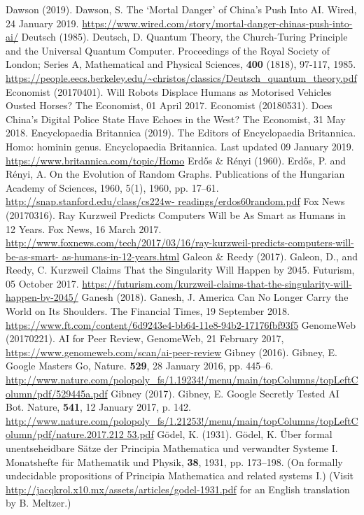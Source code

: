 \begin{multicols}{2}
\begin{thebibliography}{99}
 Dawson (2019). Dawson, S. The `Mortal Danger' of China's Push Into AI. Wired, 24 January 2019. \url{https://www.wired.com/story/mortal-danger-chinas-push-into-ai/}
 Deutsch (1985). Deutsch, D. Quantum Theory, the Church-Turing Principle and the Universal Quantum Computer. Proceedings of the Royal Society of London; Series A, Mathematical and Physical Sciences, \textbf{400} (1818), 97-117, 1985. \url{https://people.eecs.berkeley.edu/~christos/classics/Deutsch_quantum_theory.pdf}
 Economist (20170401). Will Robots Displace Humans as Motorised Vehicles Ousted Horses? The Economist, 01 April 2017.
 Economist (20180531). Does China's Digital Police State Have Echoes in the West? The Economist, 31 May 2018.
 Encyclopaedia Britannica (2019). The Editors of Encyclopaedia Britannica. Homo: hominin genus. Encyclopaedia Britannica. Last updated 09 January 2019. \url{https://www.britannica.com/topic/Homo}
 Erdős \& Rényi (1960). Erdős, P. and Rényi, A. On the Evolution of Random Graphs. Publications of the Hungarian Academy of Sciences, 1960, 5(1), 1960, pp. 17--61. \url{http://snap.stanford.edu/class/cs224w- readings/erdos60random.pdf}
 Fox News (20170316). Ray Kurzweil Predicts Computers Will be As Smart as Humans in 12 Years. Fox News, 16 March 2017. \url{http://www.foxnews.com/tech/2017/03/16/ray-kurzweil-predicts-computers-will-be-as-smart- as-humans-in-12-years.html}
 Galeon \& Reedy (2017). Galeon, D., and Reedy, C. Kurzweil Claims That the Singularity Will Happen by 2045. Futurism, 05 October 2017. \url{https://futurism.com/kurzweil-claims-that-the-singularity-will-happen-by-2045/}
 Ganesh (2018). Ganesh, J. America Can No Longer Carry the World on Its Shoulders. The Financial Times, 19 September 2018. \url{https://www.ft.com/content/6d9243e4-bb64-11e8-94b2-17176fbf93f5}
 GenomeWeb (20170221). AI for Peer Review, GenomeWeb, 21 February 2017, \url{https://www.genomeweb.com/scan/ai-peer-review}
 Gibney (2016). Gibney, E. Google Masters Go, Nature. \textbf{529}, 28 January 2016, pp. 445--6. \url{http://www.nature.com/polopoly_fs/1.19234!/menu/main/topColumns/topLeftColumn/pdf/529445a.pdf}
 Gibney (2017). Gibney, E. Google Secretly Tested AI Bot. Nature, \textbf{541}, 12 January 2017, p. 142. \url{http://www.nature.com/polopoly_fs/1.21253!/menu/main/topColumns/topLeftColumn/pdf/nature.2017.212 53.pdf}
 Gödel, K. (1931). Gödel, K. Über formal unentseheidbare Sätze der Principia Mathematica und verwandter Systeme I. Monatshefte für Mathematik und Physik, \textbf{38}, 1931, pp. 173--198. (On formally undecidable propositions of Principia Mathematica and related systems I.) (Visit \url{http://jacqkrol.x10.mx/assets/articles/godel-1931.pdf} for an English translation by B. Meltzer.)

\end{thebibliography}
\end{multicols}
